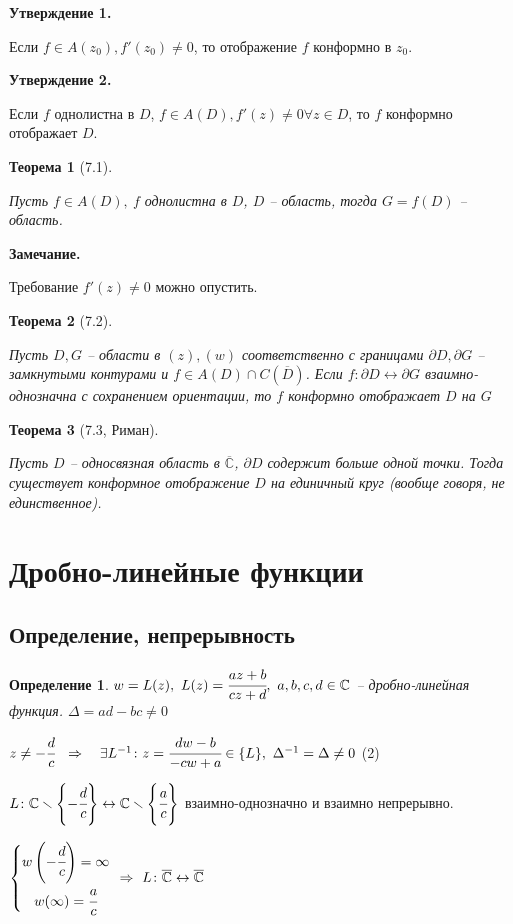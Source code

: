 \documentclass[final]{report}
\newcommand{\forcenewline}{$\phantom{\mbox{newline}}$\newline}
\newcommand{\dd}{\partial}
\newcommand{\then}{\ \Rightarrow\ }
\renewcommand{\C}{\mathbb{C}}
\renewcommand{\bar}{\overline}
\newcommand{\D}{\Delta}
\newcommand{\E}{\ \exists}
\newcommand{\CC}{\bar{\C}}
\newcommand{\sys}[1]{\left\{\begin{matrix}#1\end{matrix}\right.}
\newcommand{\opr}[1]{\begin{opred}#1\end{opred}}
\newtheorem*{theor}{Теорема}
\newtheorem*{opred}{Определение}
\theoremstyle{remark}
\begin{document}
{\bfseries Утверждение 1.}

Если $f\in A(z_0), f'(z_0)\neq 0$, то отображение $f$ конформно в $z_0$.

{\bfseries Утверждение 2.}

Если $f$ однолистна в $D$, $f\in A(D), f'(z)\neq0 \forall z\in D$, то $f$ конформно отображает $D$.

\begin{theor}[7.1]
\forcenewline

Пусть $f\in A(D),\ f$ однолистна в $D$, $D$ -- область, тогда $G=f(D)$ -- область.
\end{theor}
{\bfseries Замечание.}

Требование $f'(z)\neq0$ можно опустить.
\begin{theor}[7.2]
\forcenewline

Пусть $D,G$ -- области в $(z), (w)$ соответственно с границами $\dd D, \dd G$ -- замкнутыми контурами и $f\in A(D)\cap C(\bar{D})$. Если $f\colon \dd D\leftrightarrow \dd G$ взаимно-однозначна с сохранением ориентации, то $f$ конформно отображает $D$ на $G$
\end{theor}
\begin{theor}[7.3, Риман]
\forcenewline

Пусть $D$ -- односвязная область в $\CC$, $\dd D$ содержит больше одной точки. Тогда существует конформное отображение $D$ на единичный круг (вообще говоря, не единственное).
\end{theor}

\newpage

\section{Дробно-линейные функции}

\subsection{Определение, непрерывность}

\opr{$w=L(z),\ L(z)=\cfrac{az+b}{cz+d},\ a,b,c,d\in \C$ -- дробно-линейная функция. $\D=ad-bc\neq0$}

$z\neq-\cfrac dc\ \then\ \E L^{-1}\colon z=\cfrac{dw-b}{-cw+a}\in\{L\},\ \D^{-1}=\D\neq0$ (2)

$L\colon \C\smallsetminus\left\{-\cfrac dc\right\}\leftrightarrow \C\smallsetminus\left\{\cfrac ac\right\}$ взаимно-однозначно и взаимно непрерывно.

$\sys{w\left(-\cfrac dc\right)=\infty \\ w(\infty)=\cfrac ac} \then L\colon \CC \leftrightarrow \CC$
\end{document}
